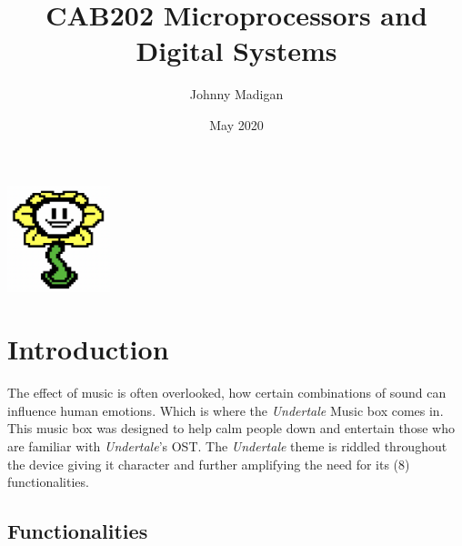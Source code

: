 \documentclass[a4paper]{article}
\title{CAB202 Microprocessors and Digital Systems\vspace{-3ex}}
\author{Johnny Madigan}
\date{\vspace{-3ex}May 2020\vspace{20ex}}
\begin{document}
\maketitle
\begin{center}
\includegraphics[width=3cm]{flower.png}
\end{center}
\newpage
\tableofcontents
\newpage

\section{Introduction}\label{sec:introduction}
\par The effect of music is often overlooked, how certain combinations of sound can influence human emotions. Which is where the \emph{Undertale} Music box comes in. This music box was designed to help calm people down and entertain those who are familiar with \emph{Undertale}'s OST. The \emph{Undertale} theme is riddled throughout the device giving it character and further amplifying the need for its (8) functionalities.

\subsection{Functionalities}
\end{document}
